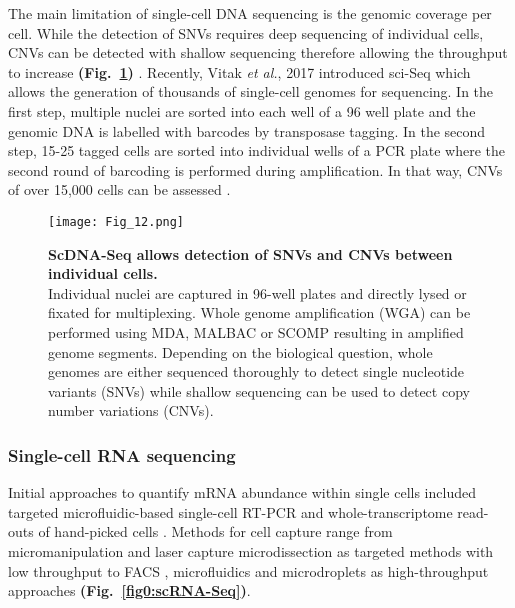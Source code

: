 The main limitation of single-cell DNA sequencing is the genomic coverage per cell. 
While the detection of SNVs requires deep sequencing of individual cells, CNVs can be detected with shallow sequencing therefore allowing the throughput to increase \textbf{(Fig.~\ref{fig0:scDNA-Seq})} \citep{Knouse2016, Baslan2015}. 
Recently, Vitak \emph{et al.}, 2017 introduced \gls{sci-Seq} which allows the generation of thousands of single-cell genomes for sequencing. 
In the first step, multiple nuclei are sorted into each well of a 96 well plate and the genomic DNA is labelled with barcodes by transposase tagging. 
In the second step, 15-25 tagged cells are sorted into individual wells of a PCR plate where the second round of barcoding is performed during amplification. In that way, CNVs of over 15,000 cells can be assessed \citep{Vitak2017}.

\begin{figure}[!h]
\centering
\texttt{[image: Fig\_12.png]}
\caption[ScDNA-Seq allows detection of SNVs and CNVs between individual cells]{\textbf{ScDNA-Seq allows detection of SNVs and CNVs between individual cells.}\\
Individual nuclei are captured in 96-well plates and directly lysed or fixated for multiplexing. Whole genome amplification (WGA) can be performed using MDA, MALBAC or SCOMP resulting in amplified genome segments. 
Depending on the biological question, whole genomes are either sequenced thoroughly to detect single nucleotide variants (SNVs) while shallow sequencing can be used to detect copy number variations (CNVs).}
\label{fig0:scDNA-Seq}
\end{figure}

\vspace{-5mm}

\subsubsection{Single-cell RNA sequencing}

Initial approaches to quantify mRNA abundance within single cells included targeted microfluidic-based single-cell \gls{RT-PCR} \citep{Warren2006} and whole-transcriptome read-outs of hand-picked cells \citep{Tang2009}. 
Methods for cell capture range from micromanipulation \citep{Grindberg2014} and laser capture microdissection \citep{Frumkin2008} as targeted methods with low throughput to  \gls{FACS} \citep{Hayashi2010, Dalerba2011, Jaitin2014}, microfluidics \citep{Trapnell2014, Treutlein2014} and microdroplets \citep{Klein2015, Macosko2015} as high-throughput approaches \citep{Prakadan2017} \textbf{(Fig.~\ref{fig0:scRNA-Seq})}. \\

